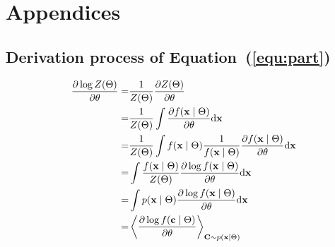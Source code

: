 \section{Appendices}
\subsection{Derivation process of Equation~(\ref{equ:part})}
\label{app:part}
\begin{equation}
\begin{aligned}
\dfrac{\partial \log Z(\Theta)}{\partial \theta}
=&\frac{1}{Z(\Theta)}\dfrac{\partial Z(\Theta)}{\partial \theta}\\
=&\frac{1}{Z(\Theta)} \int \dfrac{\partial f(\mathbf{x} \mid \Theta)}{\partial \theta} \mathrm{d} \mathbf{x} \\
=&\frac{1}{Z(\Theta)} \int f(\mathbf{x} \mid \Theta) \frac{1}{f(\mathbf{x} \mid \Theta)} \dfrac{\partial  f(\mathbf{x} \mid \Theta)}{\partial \theta} \mathrm{d} \mathbf{x}\\
=& \int \frac{f(\mathbf{x} \mid \Theta) }{Z(\Theta)} \dfrac{\partial \log f(\mathbf{x} \mid \Theta)}{\partial \theta} \mathrm{d} \mathbf{x}\\
=& \int  p(\mathbf{x} \mid \Theta) \dfrac{\partial \log f(\mathbf{x} \mid \Theta)}{\partial \theta} \mathrm{d} \mathbf{x}\\
=&\left \langle \dfrac{\partial \log f(\mathbf{c} \mid \Theta)}{\partial \theta}\right \rangle_{\mathbf{C} \sim p(\mathbf{x} \mid \Theta)}
\end{aligned}
\end{equation}
